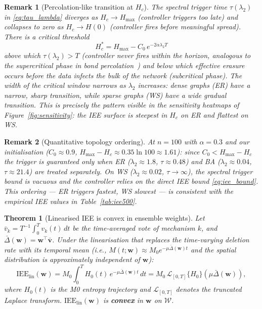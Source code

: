 \documentclass[review,12pt]{elsarticle}
\newcommand{\bfw}{\mathbf{w}}
\newcommand{\bfv}{\mathbf{v}}
\newcommand{\IEE}{\mathrm{IEE}}
\newcommand{\Hc}{H_c}
\newcommand{\Hmax}{H_{\max}}
\newcommand{\lambdat}{\lambda_2}
\newtheorem{theorem}{Theorem}
\newtheorem{remark}{Remark}
\begin{document}
\begin{remark}[Percolation-like transition at $\Hc$]
\label{rem:percolation}
The spectral trigger time $\tau(\lambdat)$ in \eqref{eq:tau_lambda}
diverges as $\Hc \to \Hmax$ (controller triggers too late) and collapses
to zero as $\Hc \to H(0)$ (controller fires before meaningful spread).
There is a critical threshold
\[
  \Hc^* = \Hmax - C_0\,e^{-2\alpha\lambdat T}
\]
above which $\tau(\lambdat) > T$ (controller never fires within the
horizon, analogous to the \emph{supercritical} phase in bond
percolation~\cite{bollobas2006percolation}) and below which effective
erasure occurs before the data infects the bulk of the network
(\emph{subcritical} phase).  The width of the critical window narrows
as $\lambdat$ increases: dense graphs (ER) have a narrow, sharp
transition, while sparse graphs (WS) have a wide gradual transition.
This is precisely the pattern visible in the sensitivity heatmaps of
Figure~\ref{fig:sensitivity}: the IEE surface is steepest in $\Hc$
on ER and flattest on WS.
\end{remark}

\begin{remark}[Quantitative topology ordering]
\label{rem:lambda2}
At $n=100$ with $\alpha=0.3$ and our initialisation ($C_0\approx 0.9$,
$\Hmax-\Hc\approx 0.35\ln 100 \approx 1.61$): since $C_0 < \Hmax-\Hc$
the trigger is guaranteed only when ER ($\lambdat\approx 1.8$, $\tau\approx
0.48$) and BA ($\lambdat\approx 0.04$, $\tau\approx 21.4$) are treated
separately.  On WS ($\lambdat\approx 0.02$, $\tau\to\infty$), the spectral
trigger bound is vacuous and the controller relies on the direct IEE bound
\eqref{eq:iee_bound}.  This ordering --- ER triggers fastest, WS slowest
--- is consistent with the empirical IEE values in Table~\ref{tab:iee500}.
\end{remark}

\begin{theorem}[Linearised IEE is convex in ensemble weights]
\label{thm:lin_convex}
Let $\bar{v}_k = T^{-1}\!\int_0^T\! v_k(t)\,dt$ be the time-averaged vote
of mechanism $k$, and $\bar{\Delta}(\bfw) = \bfw^\top\bar{\bfv}$.
Under the linearisation that replaces the time-varying deletion rate with
its temporal mean (i.e., $M(t;\bfw) \approx M_0 e^{-\mu\bar{\Delta}(\bfw)t}$
and the spatial distribution is approximately independent of $\bfw$):
\begin{equation}
  \IEE_{\mathrm{lin}}(\bfw)
    = M_0 \int_0^T H_0(t)\,e^{-\mu\bar{\Delta}(\bfw)t}\,dt
    = M_0\,\mathcal{L}_{[0,T]}\{H_0\}\!\left(\mu\bar{\Delta}(\bfw)\right),
  \label{eq:iee_lin}
\end{equation}
where $H_0(t)$ is the M0 entropy trajectory and $\mathcal{L}_{[0,T]}$
denotes the truncated Laplace transform. $\IEE_{\mathrm{lin}}(\bfw)$ is
\textbf{convex} in $\bfw$ on $\mathcal{W}$.
\end{theorem}
\end{document}
